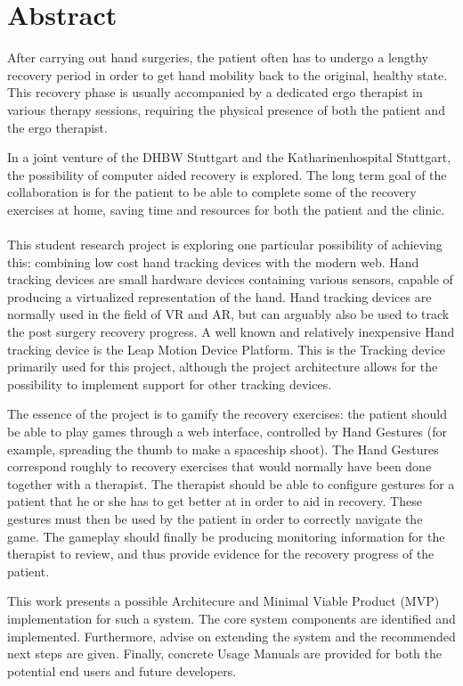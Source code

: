 \chapter{Abstract}

After carrying out hand surgeries, the patient often has to undergo a lengthy recovery period in order to get hand mobility back to the original, healthy state. This recovery phase is usually accompanied by a dedicated ergo therapist in various therapy sessions, requiring the physical presence of both the patient and the ergo therapist.

In a joint venture of the DHBW Stuttgart and the Katharinenhospital Stuttgart, the possibility of computer aided recovery is explored. The long term goal of the collaboration is for the patient to be able to complete some of the recovery exercises at home, saving time and resources for both the patient and the clinic.
\\\\
This student research project is exploring one particular possibility of achieving this: combining low cost hand tracking devices with the modern web. Hand tracking devices are small hardware devices containing various sensors, capable of producing a virtualized representation of the hand. Hand tracking devices are normally used in the field of \gls{VR} and \gls{AR}, but can arguably also be used to track the post surgery recovery progress. A well known and relatively inexpensive Hand tracking device is the Leap Motion Device Platform. This is the Tracking device primarily used for this project, although the project architecture allows for the possibility to implement support for other tracking devices.

The essence of the project is to gamify the recovery exercises: the patient should be able to play games through a web interface, controlled by Hand Gestures (for example, spreading the thumb to make a spaceship shoot). The Hand Gestures correspond roughly to recovery exercises that would normally have been done together with a therapist. The therapist should be able to configure gestures for a patient that he or she has to get better at in order to aid in recovery. These gestures must then be used by the patient in order to correctly navigate the game. The gameplay should finally be producing monitoring information for the therapist to review, and thus provide evidence for the recovery progress of the patient.

This work presents a possible Architecure and Minimal Viable Product (MVP) implementation for such a system. The core system components are identified and implemented. Furthermore, advise on extending the system and the recommended next steps are given. Finally, concrete Usage Manuals are provided for both the potential end users and future developers.
